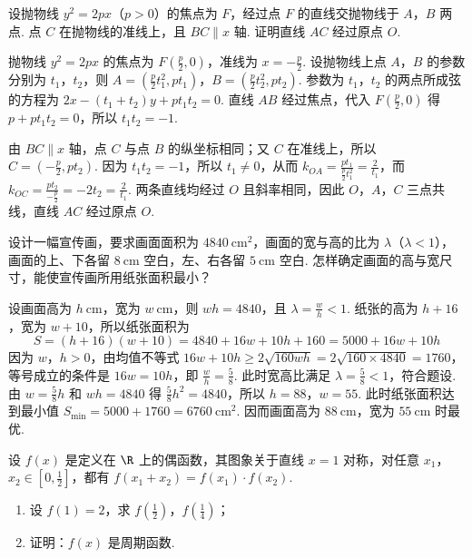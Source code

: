 \begin{problem}
设抛物线 \(y^{2} = 2px\)（\(p > 0\)）的焦点为 \(F\)，经过点 \(F\) 的直线交抛物线于 \(A\)，\(B\) 两点. 点 \(C\) 在抛物线的准线上，且 \(BC \parallel x\) 轴. 证明直线 \(AC\) 经过原点 \(O\).
\end{problem}

\begin{solution}
抛物线 \(y^2=2px\) 的焦点为 \(F\left(\frac p2,0\right)\)，准线为 \(x=-\frac p2\). 设抛物线上点 \(A\)，\(B\) 的参数分别为 \(t_1\)，\(t_2\)，则
\(A=\left(\frac p2t_1^2,pt_1\right)\)，\(B=\left(\frac p2t_2^2,pt_2\right)\). 参数为 \(t_1\)，\(t_2\) 的两点所成弦的方程为
\(2x-(t_1+t_2)y+pt_1t_2=0\). 直线 \(AB\) 经过焦点，代入 \(F\left(\frac p2,0\right)\) 得 \(p+pt_1t_2=0\)，所以 \(t_1t_2=-1\).

由 \(BC\parallel x\) 轴，点 \(C\) 与点 \(B\) 的纵坐标相同；又 \(C\) 在准线上，所以 \(C=\left(-\frac p2,pt_2\right)\). 因为 \(t_1t_2=-1\)，所以 \(t_1\ne0\)，从而
\(k_{OA}=\frac{pt_1}{\frac p2t_1^2}=\frac{2}{t_1}\)，而
\(k_{OC}=\frac{pt_2}{-\frac p2}=-2t_2=\frac{2}{t_1}\). 两条直线均经过 \(O\) 且斜率相同，因此 \(O\)，\(A\)，\(C\) 三点共线，直线 \(AC\) 经过原点 \(O\).
\end{solution}

\begin{problem}
设计一幅宣传画，要求画面面积为 \(4840 \mathrm{~cm}^{2}\)，画面的宽与高的比为 \(\lambda\)（\(\lambda < 1\)），画面的上、下各留 \(8 \mathrm{~cm}\) 空白，左、右各留 \(5 \mathrm{~cm}\) 空白. 怎样确定画面的高与宽尺寸，能使宣传画所用纸张面积最小？
\end{problem}

\begin{solution}
设画面高为 \(h\mathrm{~cm}\)，宽为 \(w\mathrm{~cm}\)，则 \(wh=4840\)，且 \(\lambda=\frac{w}{h}<1\). 纸张的高为 \(h+16\)，宽为 \(w+10\)，所以纸张面积为
\[
S=(h+16)(w+10)=4840+16w+10h+160=5000+16w+10h
\]
因为 \(w\)，\(h>0\)，由均值不等式
\(16w+10h\geqslant2\sqrt{160wh}=2\sqrt{160\times4840}=1760\)，等号成立的条件是 \(16w=10h\)，即 \(\frac{w}{h}=\frac58\). 此时宽高比满足 \(\lambda=\frac58<1\)，符合题设. 由 \(w=\frac58h\) 和 \(wh=4840\) 得 \(\frac58h^2=4840\)，所以 \(h=88\)，\(w=55\). 此时纸张面积达到最小值
\(S_{\min}=5000+1760=6760\mathrm{~cm}^{2}\). 因而画面高为 \(88\mathrm{~cm}\)，宽为 \(55\mathrm{~cm}\) 时最优.
\end{solution}

\begin{problem}
设 \(f(x)\) 是定义在 \(\R\) 上的偶函数，其图象关于直线 \(x = 1\) 对称，对任意 \(x_{1}\)，\(x_{2} \in \left[0, \frac{1}{2}\right]\)，都有 \(f(x_{1} + x_{2}) = f(x_{1}) \cdot f(x_{2})\).

\begin{enumerate}
\item 设 \(f(1)=2\)，求 \(f\left(\frac{1}{2}\right)\)，\(f\left(\frac{1}{4}\right)\)；
\item 证明：\(f(x)\) 是周期函数.
\end{enumerate}
\end{problem}

